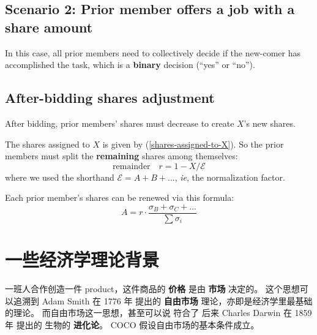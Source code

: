 \documentclass[12pt, orivec]{article}
\newcommand{\cc}[2]{#1}
\newcommand{\cc}[2]{#2}
\begin{document}
\subsection{Scenario 2:  Prior member offers a job with a share amount}

In this case, all prior members need to collectively decide if the new-comer has accomplished the task, which is a \textbf{binary} decision (``yes'' or ``no'').


\subsection{After-bidding shares adjustment}

After bidding, prior members' shares must decrease to create $X$'s new shares.

The shares assigned to $X$ is given by (\ref{shares-assigned-to-X}).  So the prior members must split the \textbf{remaining} shares among themselves:
\begin{equation}
\boxed{\mbox{remainder}} \quad r = 1 - X / \mathcal{E}
\end{equation}
where we used the shorthand $\mathcal{E} = A + B + ...$, \textit{ie}, the normalization factor.

Each prior member's shares can be renewed via this formula:
\begin{equation}
A = r \cdot \frac{\sigma_B + \sigma_C + ...}{\sum \sigma_i}
\end{equation}

\section{\cc{一些经济学理论背景}{Some economic-theoretical background}}

\cc{
	一班人合作创造一件 product，这件商品的 \textbf{价格} 是由 \textbf{市场} 决定的。  这个思想可以追溯到 Adam Smith 在 1776 年 提出的 \textbf{自由市场} 理论，亦即是经济学里最基础的理论。 而自由市场这一思想，甚至可以说 符合了 后来 Charles Darwin 在 1859 年 提出的 生物的 \textbf{进化论}。  COCO 假设自由市场的基本条件成立。
}{
	When a group of people creates a \textbf{product}, its \textbf{price} is determined by the \textbf{market}.  This idea, first articulated by Adam Smith in 1776, is one of the foundational principles of all economics.  It can be said that free-market competition is also congruent with the idea of biological \textbf{evolution}, posited by Charles Darwin, later in 1859.  We assume here that the conditions of free-market economics are satisfied.
}
\end{document}
